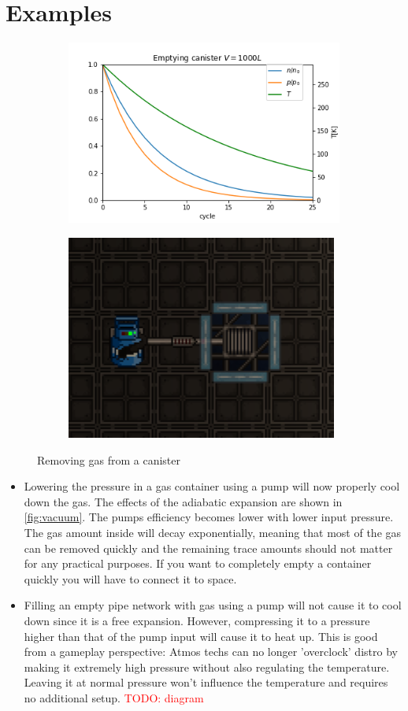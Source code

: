 \documentclass[12pt,a4paper]{article}
\newcommand\todo[1]{\textcolor{red}{TODO: #1}}
\numberwithin{equation}{section}
\begin{document}
\section{Examples}
\begin{figure}[h]
\centering
   	\begin{subfigure}{.45\textwidth}
    \centering
	\includegraphics[scale=0.45]{plot2}
	\end{subfigure}
   	\begin{subfigure}{.45\textwidth}
    \centering
	\includegraphics[scale=0.52]{screen1}
	\end{subfigure}
\caption{Removing gas from a canister}
\label{fig:vacuum}
\end{figure}
\begin{itemize}
\item Lowering the pressure in a gas container using a pump will now properly cool down the gas. The effects of the adiabatic expansion are shown in \autoref{fig:vacuum}. The pumps efficiency becomes lower with lower input pressure. The gas amount inside will decay exponentially, meaning that most of the gas can be removed quickly and the remaining trace amounts should not matter for any practical purposes. If you want to completely empty a container quickly you will have to connect it to space.
\item Filling an empty pipe network with gas using a pump will not cause it to cool down since it is a free expansion. However, compressing it to a pressure higher than that of the pump input will cause it to heat up. This is good from a gameplay perspective: Atmos techs can no longer 'overclock' distro by making it extremely high pressure without also regulating the temperature. Leaving it at normal pressure won't influence the temperature and requires no additional setup. \todo{diagram}
\end{itemize}
\end{document}
